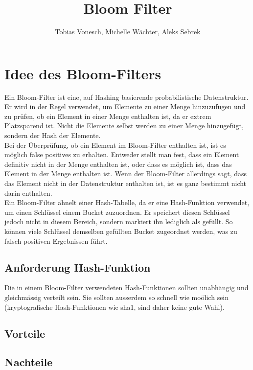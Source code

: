 \documentclass[11pt]{article}
\title{Bloom Filter}
\author{Tobias Vonesch, Michelle Wächter, Aleks Sebrek}
\begin{document}
    \maketitle

    \section{Idee des Bloom-Filters}

    Ein Bloom-Filter ist eine, auf Hashing basierende probabilistische Datenstruktur.
    Er wird in der Regel verwendet, um Elemente zu einer Menge hinzuzuf{\"u}gen und zu pr{\"u}fen, ob ein Element in einer Menge enthalten ist, da er extrem Platzsparend ist.
    Nicht die Elemente selbst werden zu einer Menge hinzugef{\"u}gt, sondern der Hash der Elemente. \\

    Bei der {\"U}berpr{\"u}fung, ob ein Element im Bloom-Filter enthalten ist, ist es m{\"o}glich false positives zu erhalten.
    Entweder stellt man fest, dass ein Element definitiv nicht in der Menge enthalten ist, oder dass es m{\"o}glich ist, dass das Element in der Menge enthalten ist.
    Wenn der Bloom-Filter allerdings sagt, dass das Element nicht in der Datenstruktur enthalten ist, ist es ganz bestimmt nicht darin enthalten.\\

    Ein Bloom-Filter {\"a}hnelt einer Hash-Tabelle, da er eine Hash-Funktion verwendet, um einen Schl{\"u}ssel einem Bucket zuzuordnen.
    Er speichert diesen Schl{\"u}ssel jedoch nicht in diesem Bereich, sondern markiert ihn lediglich als gef{\"u}llt.
    So k{\"o}nnen viele Schl{\"u}ssel demselben gef{\"u}llten Bucket zugeordnet werden, was zu falsch positiven Ergebnissen f{\"u}hrt.

    \subsection{Anforderung Hash-Funktion}
    Die in einem Bloom-Filter verwendeten Hash-Funktionen sollten unabh{\"a}ngig und gleichm{\"a}ssig verteilt sein.
    Sie sollten ausserdem so schnell wie mo{\"o}lich sein (kryptografische Hash-Funktionen wie sha1, sind daher keine gute Wahl).

    \subsection{Vorteile}

    \subsection{Nachteile}
\end{document}
